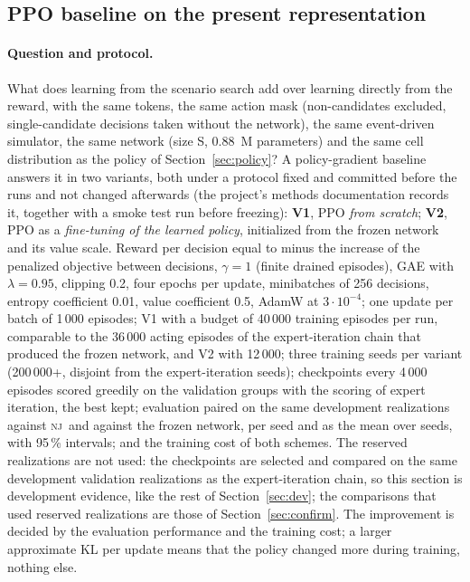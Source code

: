 \documentclass[11pt,a4paper]{article}
\theoremstyle{plain}
\theoremstyle{definition}
\theoremstyle{remark}
\newcommand{\nj}{\textsc{nj}}
\begin{document}
\subsection{PPO baseline on the present representation}\label{sec:ppo}
\paragraph{Question and protocol.}
What does learning from the scenario search add over learning directly from the reward,
with the same tokens, the same action mask (non-candidates excluded, single-candidate
decisions taken without the network), the same event-driven simulator, the same network
(size S, 0.88~M parameters) and the same cell distribution as the policy of
Section~\ref{sec:policy}? A policy-gradient baseline \cite{Schulman2017} answers it in
two variants, both under a protocol fixed and committed before the runs and not changed
afterwards (the project's methods documentation records it, together with a smoke test
run before freezing): \textbf{V1}, PPO \emph{from scratch}; \textbf{V2}, PPO as a
\emph{fine-tuning of the learned policy}, initialized from the frozen network and its
value scale. Reward per decision equal to minus the increase of the penalized objective
between decisions, $\gamma=1$ (finite drained episodes), GAE with $\lambda=0.95$,
clipping 0.2, four epochs per update, minibatches of 256 decisions, entropy coefficient
0.01, value coefficient 0.5, AdamW at $3\cdot10^{-4}$; one update per batch of 1\,000
episodes; V1 with a budget of 40\,000 training episodes per run, comparable to the
36\,000 acting episodes of the expert-iteration chain that produced the frozen network,
and V2 with 12\,000; three training seeds per variant (200\,000+, disjoint from the
expert-iteration seeds); checkpoints every 4\,000 episodes scored greedily on the
validation groups with the scoring of expert iteration, the best kept; evaluation paired
on the same development realizations against \nj\ and against the frozen network, per
seed and as the mean over seeds, with 95\,\% intervals; and the training cost of both
schemes. The reserved realizations are not used: the checkpoints are selected and compared on
the same development validation realizations as the expert-iteration chain, so this
section is development evidence, like the rest of Section~\ref{sec:dev}; the
comparisons that used reserved realizations are those of Section~\ref{sec:confirm}. The
improvement is decided by the evaluation performance and the training cost; a larger
approximate KL per update means that the policy changed more during training, nothing
else.
\end{document}
